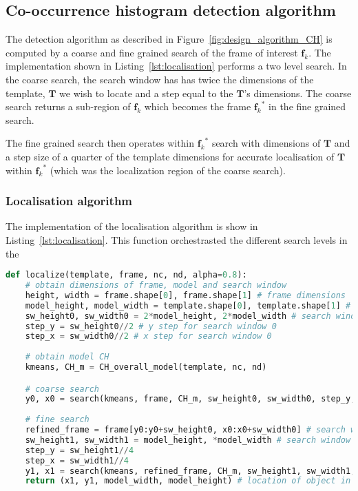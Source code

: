 \subsection{Co-occurrence histogram detection algorithm}
The detection algorithm as described in Figure~\ref{fig:design_algorithm_CH}
is computed by a coarse and fine grained search of the frame of interest $\mathbf{f}_k$. 
The implementation shown in Listing~\ref{lst:localisation} performs a two level
search. In the coarse search, the search window has has twice the dimensions of the
template, $\mathbf{T}$ we wish to locate and a step equal to the $\mathbf{T}$'s dimensions. The
coarse search returns a sub-region of $\mathbf{f}_k$ which becomes the
frame ${\mathbf{f}_k}^*$ in the fine grained search. 

The fine grained search then operates within ${\mathbf{f}_k}^*$
search with dimensions of $\mathbf{T}$ and a step size of a quarter of the
template dimensions for accurate localisation of $\mathbf{T}$ within
${\mathbf{f}_k}^*$ (which was the localization region of the coarse search).

\subsubsection{Localisation algorithm}
The implementation of the localisation algorithm is show in Listing~\ref{lst:localisation}. This
function orchestrasted the different search levels in the 
\begin{lstlisting}[language=Python, caption={CCH detection localization algorithm}, captionpos=b, label={lst:localisation}]
def localize(template, frame, nc, nd, alpha=0.8):
    # obtain dimensions of frame, model and search window
    height, width = frame.shape[0], frame.shape[1] # frame dimensions
    model_height, model_width = template.shape[0], template.shape[1] # model dimensions
    sw_height0, sw_width0 = 2*model_height, 2*model_width # search window dimensions
    step_y = sw_height0//2 # y step for search window 0
    step_x = sw_width0//2 # x step for search window 0
    
    # obtain model CH
    kmeans, CH_m = CH_overall_model(template, nc, nd) 

    # coarse search
    y0, x0 = search(kmeans, frame, CH_m, sw_height0, sw_width0, step_y, step_x, nc, nd, alpha) 
    
    # fine search
    refined_frame = frame[y0:y0+sw_height0, x0:x0+sw_width0] # search within best coarse result
    sw_height1, sw_width1 = model_height, *model_width # search window dimensions
    step_y = sw_height1//4
    step_x = sw_width1//4
    y1, x1 = search(kmeans, refined_frame, CH_m, sw_height1, sw_width1, step_y, step_x, nc, nd, alpha)  
    return (x1, y1, model_width, model_height) # location of object in frame
\end{lstlisting}


